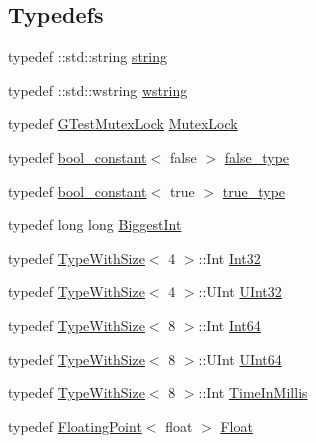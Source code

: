 \subsection*{Typedefs}
\begin{DoxyCompactItemize}
\item 
typedef \-::std\-::string \hyperlink{namespacetesting_1_1internal_a8e8ff5b11e64078831112677156cb111}{string}
\item 
typedef \-::std\-::wstring \hyperlink{namespacetesting_1_1internal_a3f543179329c353aee1d7b54a9a8e335}{wstring}
\item 
typedef \hyperlink{classtesting_1_1internal_1_1GTestMutexLock}{G\-Test\-Mutex\-Lock} \hyperlink{namespacetesting_1_1internal_a08b187c6cc4e28400aadf9a32fccc8de}{Mutex\-Lock}
\item 
typedef \hyperlink{structtesting_1_1internal_1_1bool__constant}{bool\-\_\-constant}$<$ false $>$ \hyperlink{namespacetesting_1_1internal_abb1d0789f19bdde21affccbd1078b525}{false\-\_\-type}
\item 
typedef \hyperlink{structtesting_1_1internal_1_1bool__constant}{bool\-\_\-constant}$<$ true $>$ \hyperlink{namespacetesting_1_1internal_a62f917c3424d8841de9b49b5ec28edb4}{true\-\_\-type}
\item 
typedef long long \hyperlink{namespacetesting_1_1internal_a05c6bd9ede5ccdf25191a590d610dcc6}{Biggest\-Int}
\item 
typedef \hyperlink{classtesting_1_1internal_1_1TypeWithSize}{Type\-With\-Size}$<$ 4 $>$\-::Int \hyperlink{namespacetesting_1_1internal_a8ee38faaf875f133358abaf9bc056cec}{Int32}
\item 
typedef \hyperlink{classtesting_1_1internal_1_1TypeWithSize}{Type\-With\-Size}$<$ 4 $>$\-::U\-Int \hyperlink{namespacetesting_1_1internal_a40d4fffcd2bf56f18b1c380615aa85e3}{U\-Int32}
\item 
typedef \hyperlink{classtesting_1_1internal_1_1TypeWithSize}{Type\-With\-Size}$<$ 8 $>$\-::Int \hyperlink{namespacetesting_1_1internal_a271c563fec38b804ddab0677f51f70a8}{Int64}
\item 
typedef \hyperlink{classtesting_1_1internal_1_1TypeWithSize}{Type\-With\-Size}$<$ 8 $>$\-::U\-Int \hyperlink{namespacetesting_1_1internal_aa6a1ac454e6d7e550fa4925c62c35caa}{U\-Int64}
\item 
typedef \hyperlink{classtesting_1_1internal_1_1TypeWithSize}{Type\-With\-Size}$<$ 8 $>$\-::Int \hyperlink{namespacetesting_1_1internal_a66a845df404b38fe85c5e14a069f255a}{Time\-In\-Millis}
\item 
typedef \hyperlink{classtesting_1_1internal_1_1FloatingPoint}{Floating\-Point}$<$ float $>$ \hyperlink{namespacetesting_1_1internal_a02e1981f5ff70609e6ac06e006ff519a}{Float}

\end{DoxyCompactItemize}
